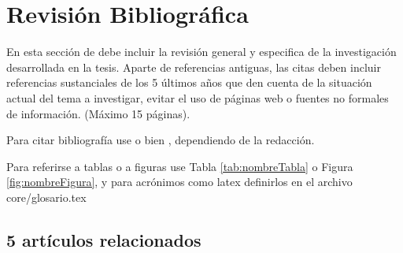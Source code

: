 
\chapter{Revisión Bibliográfica}
\label{ch:litRev} %

{\color{blue} En esta sección de debe incluir la revisión general y especifica de la investigación
desarrollada en la tesis.
Aparte de referencias antiguas, las citas deben incluir referencias sustanciales de
los 5 últimos años que den cuenta de la situación actual del tema a investigar,
evitar el uso de páginas web o fuentes no formales de información. (Máximo 15 páginas). }

\vspace{0.5cm}

Para citar bibliografía use  o bien
\cite{pastor_sustainable_2020}, dependiendo de la redacción.

Para referirse a tablas o a figuras use Tabla \ref{tab:nombreTabla} o Figura \ref{fig:nombreFigura},
y para acrónimos como \gls{latex} definirlos en el archivo core/glosario.tex

\section{5 artículos relacionados}%


